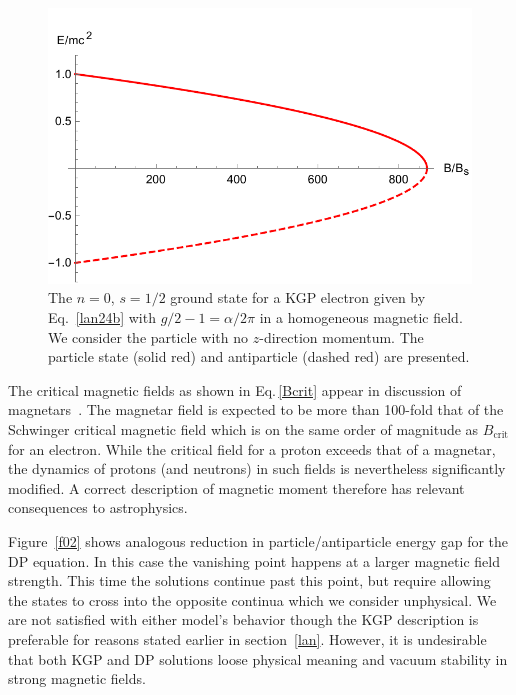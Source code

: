 \documentclass[epj]{svjour}
\begin{document}
\begin{figure}
 \centering
 \includegraphics[clip, trim=0.0cm 0.0cm 0.0cm 0.5cm,width=\linewidth]{lanplot01}
 \caption[]{The $n=0$, $s=1/2$ ground state for a KGP electron given by Eq.~\eqref{lan24b} with $g/2-1=\alpha/2\pi$ in a homogeneous magnetic field. We consider the particle with no $z$-direction momentum. The particle state (solid red) and antiparticle (dashed red) are presented.}
 \label{f01}
\end{figure}

The critical magnetic fields as shown in Eq.\,\eqref{Bcrit} appear in discussion of magnetars~\cite{Kaspi:2017fwg}. The magnetar field is expected to be more than 100-fold that of the Schwinger critical magnetic field which is on the same order of magnitude as $B_\textrm{crit}$ for an electron. While the critical field for a proton exceeds that of a magnetar, the dynamics of protons (and neutrons) in such fields is nevertheless significantly modified. A correct description of magnetic moment therefore has relevant consequences to astrophysics. 

Figure~\ref{f02} shows analogous reduction in particle/anti\-particle energy gap for the DP equation. In this case the vanishing point happens at a larger magnetic field strength. This time the solutions continue past this point, but require allowing the states to cross into the opposite continua which we consider unphysical. We are not satisfied with either model\rq s behavior though the KGP description is preferable for reasons stated earlier in section~\ref{lan}. However, it is undesirable that both KGP and DP solutions loose physical meaning and vacuum stability in strong magnetic fields.
\end{document}
